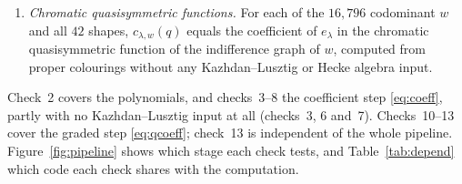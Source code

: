 \documentclass[11pt]{amsart}
\theoremstyle{definition}
\theoremstyle{remark}
\begin{document}
\begin{enumerate}
\begin{enumerate}
  \end{enumerate}
\item \emph{Chromatic quasisymmetric functions.} For each of the $16{,}796$ codominant $w$ and all $42$ shapes, $c_{\lambda,w}(q)$ equals the coefficient of $e_\lambda$ in the chromatic quasisymmetric function of the indifference graph of $w$, computed from proper colourings without any Kazhdan--Lusztig or Hecke algebra input.
\end{enumerate}
Check~2 covers the polynomials, and checks~3--8 the coefficient step \eqref{eq:coeff}, partly with no Kazhdan--Lusztig input at all (checks~3, 6 and~7). Checks~10--13 cover the graded step \eqref{eq:qcoeff}; check~13 is independent of the whole pipeline. Figure~\ref{fig:pipeline} shows which stage each check tests, and Table~\ref{tab:depend} which code each check shares with the computation.
\end{document}
